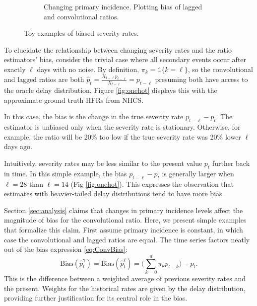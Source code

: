 \documentclass{article}
\begin{document}
\begin{figure}
\begin{subfigure}[b]{0.45\linewidth}
         \caption{Changing primary incidence. Plotting bias of lagged and convolutional ratios.}
         \label{fig:chging_primary}
     \end{subfigure}
        \caption{Toy examples of biased severity rates.}
        \label{fig:bias_ex}
\end{figure}


To elucidate the relationship between changing severity rates and the ratio estimators' bias, consider the trivial case where all secondary events occur after exactly $\ell$ days with no noise. By definition, $\pi_k = \mathds{1}\{k=\ell\}$, so the convolutional and lagged ratios are both $\hat{p}_t = \frac{X_{t-\ell}p_{t-\ell}}{X_{t-\ell}} = p_{t-\ell}$ presuming both have access to the oracle delay distribution. Figure \ref{fig:onehot} displays this with the approximate ground truth HFRs from NHCS. 

In this case, the bias is the change in the true severity rate $p_{t-\ell} - p_t$. The estimator is unbiased only when the severity rate is stationary. Otherwise, for example, the ratio will be 20\% too low if the true severity rate was 20\% lower $\ell$ days ago. 

Intuitively, severity rates may be less similar to the present value $p_t$ further back in time. In this simple example, the bias $p_{t-\ell}-p_t$ is generally larger when $\ell=28$ than $\ell=14$ (Fig \ref{fig:onehot}). This expresses the observation that estimates with heavier-tailed delay distributions tend to have more bias. 


Section \ref{sec:analysis} claims that changes in primary incidence levels affect the magnitude of bias for the convolutional ratio. Here, we present simple examples that formalize this claim. First assume primary incidence is constant, in which case the convolutional and lagged ratios are equal. The time series factors neatly out of the bias expression  \eqref{eq:ConvBias}:
$$\text{Bias}(\hat{p}_t^{\gamma}) = \text{Bias}(\hat{p}_t^\ell) = \Big(\sum_{k=0}^d \pi_k p_{t-k}\Big)-p_t.$$
\noindent This is the difference between a weighted average of previous severity rates and the present. Weights for the historical rates are given by the delay distribution, providing further justification for its central role in the bias. 
\end{document}
